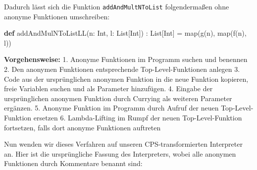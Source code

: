 \documentclass[]{article}
\newenvironment{Shaded}{}{}
\newcommand{\FunctionTok}[1]{\textcolor[rgb]{0.02,0.16,0.49}{#1}}
\newcommand{\KeywordTok}[1]{\textcolor[rgb]{0.00,0.44,0.13}{\textbf{#1}}}
\newcommand{\NormalTok}[1]{#1}
\begin{document}
Dadurch lässt sich die Funktion \texttt{addAndMultNToList}
folgendermaßen ohne anonyme Funktionen umschreiben:

\begin{Shaded}
\begin{Highlighting}[]
\KeywordTok{def} \FunctionTok{addAndMulNToListLL}\NormalTok{(n: Int, l: List[Int]) : List[Int] = }
  \FunctionTok{map}\NormalTok{(}\FunctionTok{g}\NormalTok{(n), }\FunctionTok{map}\NormalTok{(}\FunctionTok{f}\NormalTok{(n), l))}
\end{Highlighting}
\end{Shaded}

\textbf{Vorgehensweise:} 1. Anonyme Funktionen im Programm suchen und
benennen 2. Den anonymen Funktionen entsprechende Top-Level-Funktionen
anlegen 3. Code aus der ursprünglichen anonymen Funktion in die neue
Funktion kopieren, freie Variablen suchen und als Parameter hinzufügen.
4. Eingabe der ursprünglichen anonymen Funktion durch Currying als
weiteren Parameter ergänzen. 5. Anonyme Funktion im Programm durch
Aufruf der neuen Top-Level-Funktion ersetzen 6. Lambda-Lifting im Rumpf
der neuen Top-Level-Funktion fortsetzen, falls dort anonyme Funktionen
auftreten

Nun wenden wir dieses Verfahren auf unseren CPS-transformierten
Interpreter an. Hier ist die ursprüngliche Fassung des Interpreters,
wobei alle anonymen Funktionen durch Kommentare benannt sind:
\end{document}
